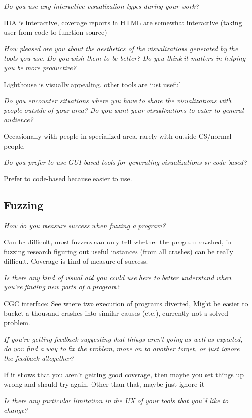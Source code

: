 \documentclass{article}
\begin{document}
\textit{Do you use any interactive visualization types during your work? }

IDA is interactive, coverage reports in HTML are somewhat interactive (taking user from code to function source) 

\textit{How pleased are you about the aesthetics of the visualizations generated by the tools you use. Do you wish them to be better? Do you think it matters in helping you be more productive?}

Lighthouse is visually appealing, other tools are just useful

\textit{Do you encounter situations where you have to share the visualizations with people outside of your area? Do you want your visualizations to cater to general-audience?}

Occasionally with people in specialized area, rarely with outside CS/normal people.

\textit{Do you prefer to use GUI-based tools for generating visualizations or code-based?}

Prefer to code-based because easier to use. 

\subsection{Fuzzing}

\textit{How do you measure success when fuzzing a program?}

Can be difficult, most fuzzers can only tell whether the program crashed, in fuzzing research figuring out useful instances (from all crashes) can be really difficult. 
Coverage is kind-of measure of success.

\textit{Is there any kind of visual aid you could use here to better understand when you’re finding new parts of a program?}

CGC interface: See where two execution of programs diverted, 
Might be easier to bucket a thousand crashes into similar causes (etc.), currently not a solved problem.  

\textit{If you’re getting feedback suggesting that things aren’t going as well as expected, do you find a way to fix the problem, move on to another target, or just ignore the feedback altogether?}

If it shows that you aren’t getting good coverage, then maybe you set things up wrong and should try again. Other than that, maybe just ignore it

\textit{Is there any particular limitation in the UX of your tools that you’d like to change?}
\end{document}
